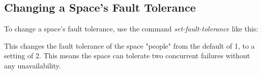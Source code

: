 \subsection{Changing a Space's Fault Tolerance}

To change a space's fault tolerance, use the command {\em set-fault-tolerance}
like this:


This changes the fault tolerance of the space "people" from the default of 1, to
a setting of 2.  This means the space can tolerate two concurrent failures
without any unavailability.
